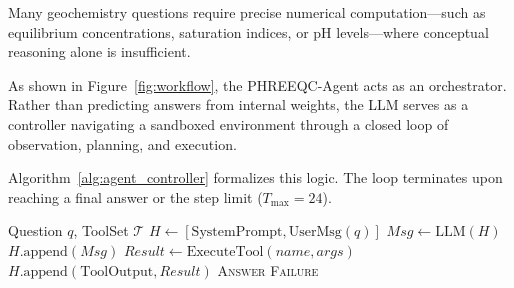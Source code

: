 \documentclass[sigconf,anonymous]{acmart}
\begin{document}
Many geochemistry questions require precise numerical computation---such as equilibrium concentrations, saturation indices, or pH levels---where conceptual reasoning alone is insufficient. 

As shown in Figure~\ref{fig:workflow}, the PHREEQC-Agent acts as an orchestrator. Rather than predicting answers from internal weights, the LLM serves as a controller navigating a sandboxed environment through a closed loop of observation, planning, and execution.

Algorithm~\ref{alg:agent_controller} formalizes this logic. The loop terminates upon reaching a final answer or the step limit ($T_{\max}=24$).

\begin{algorithm}[h]
   \caption{PHREEQC-Agent Controller}
   \label{alg:agent_controller}
\begin{algorithmic}[1]
    Question $q$, ToolSet $\mathcal{T}$
   \STATE $H \leftarrow [\text{SystemPrompt}, \text{UserMsg}(q)]$
       \STATE $Msg \leftarrow \text{LLM}(H)$ 
       \STATE $H.\text{append}(Msg)$
           \STATE $Result \leftarrow \text{ExecuteTool}(name, args)$
           \STATE $H.\text{append}(\text{ToolOutput}, Result)$
           \STATE \RETURN \textsc{Answer} 
       \ENDIF
   \ENDFOR
   \RETURN \textsc{Failure}
\end{algorithmic}
\end{algorithm}
\end{document}
